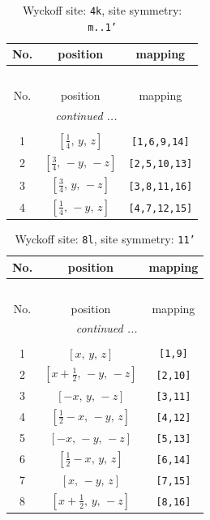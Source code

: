 \documentclass[fleqn,8pt]{jsarticle}
\begin{document}
\renewcommand{\arraystretch}{1.2}
\begin{longtable}{ccc}
\caption{Wyckoff site: {\tt 4k}, site symmetry: {\tt m..1'}}
 \\
 \hline \hline
No. & position & mapping \\ \hline \endfirsthead

\multicolumn{2}{l}{\tablename\ \thetable{}} \\
 \hline \hline
No. & position & mapping \\ \hline \endhead

 \hline \hline
\multicolumn{2}{r}{\footnotesize\it continued ...} \\ \endfoot

 \hline \hline
\multicolumn{2}{r}{} \\ \endlastfoot

1 & $\left[ \frac{1}{4},\, y,\, z \right]$ & {\tt [1,6,9,14]} \\ \hline
2 & $\left[ \frac{3}{4},\, - y,\, - z \right]$ & {\tt [2,5,10,13]} \\ \hline
3 & $\left[ \frac{3}{4},\, y,\, - z \right]$ & {\tt [3,8,11,16]} \\ \hline
4 & $\left[ \frac{1}{4},\, - y,\, z \right]$ & {\tt [4,7,12,15]} \\
\end{longtable}
\renewcommand{\arraystretch}{1.2}
\begin{longtable}{ccc}
\caption{Wyckoff site: {\tt 8l}, site symmetry: {\tt 11'}}
 \\
 \hline \hline
No. & position & mapping \\ \hline \endfirsthead

\multicolumn{2}{l}{\tablename\ \thetable{}} \\
 \hline \hline
No. & position & mapping \\ \hline \endhead

 \hline \hline
\multicolumn{2}{r}{\footnotesize\it continued ...} \\ \endfoot

 \hline \hline
\multicolumn{2}{r}{} \\ \endlastfoot

1 & $\left[ x,\, y,\, z \right]$ & {\tt [1,9]} \\ \hline
2 & $\left[ x + \frac{1}{2},\, - y,\, - z \right]$ & {\tt [2,10]} \\ \hline
3 & $\left[ - x,\, y,\, - z \right]$ & {\tt [3,11]} \\ \hline
4 & $\left[ \frac{1}{2} - x,\, - y,\, z \right]$ & {\tt [4,12]} \\ \hline
5 & $\left[ - x,\, - y,\, - z \right]$ & {\tt [5,13]} \\ \hline
6 & $\left[ \frac{1}{2} - x,\, y,\, z \right]$ & {\tt [6,14]} \\ \hline
7 & $\left[ x,\, - y,\, z \right]$ & {\tt [7,15]} \\ \hline
8 & $\left[ x + \frac{1}{2},\, y,\, - z \right]$ & {\tt [8,16]} \\
\end{longtable}
\end{document}
